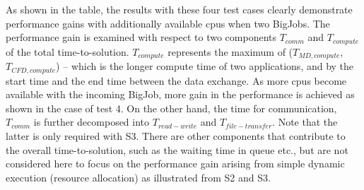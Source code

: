 \documentclass[conference,final]{IEEEtran}
\newcommand{\jhanote}[1]{ {\textcolor{red} { ***Jha: #1 }}}
\newcommand{\Jkimnote}[1]{ {\textcolor{red} { ***Jkim: #1 }}}
\newcommand{\jhanote}[1]{}
\newcommand{\Jkimnote}[1]{}
\begin{document}
As shown in the table, the results with these four test cases clearly
demonstrate performance gains with additionally available cpus when
two BigJobs.  The performance gain is examined with respect to two
components ${T_{comm}}$ and ${T_{compute}}$ of the total
time-to-solution.  %
${T_{compute}}$ represents the maximum of (${T _{MD,compute}}$,
${T_{CFD,compute}}$) -- which is the longer compute time of two
applications, and%
by the start time and the end time between the data exchange.  As more
cpus become available with the incoming BigJob, more gain in the
performance is achieved as shown in the case of test 4.  On the other
hand, the time for communication, ${T_{comm}}$ is further decomposed
into ${T_{read-write}}$ and ${T_{file-transfer}}$.  Note that the
latter is only required with S3.  There are other components that
contribute to the overall time-to-solution, such as the waiting time
in queue etc., but are not considered here to focus on the performance
gain arising from simple dynamic execution (resource allocation) as
illustrated from S2 and S3.


\end{document}
